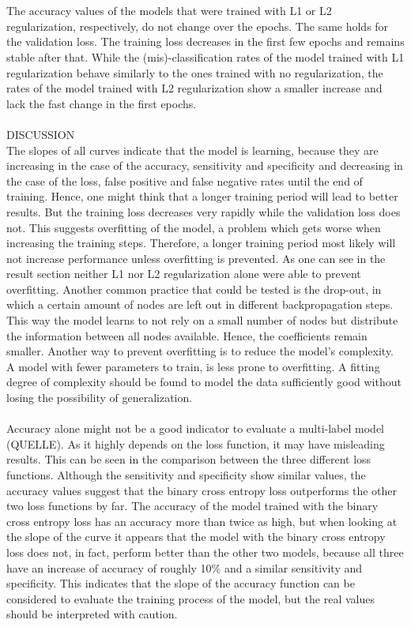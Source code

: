 \\
\\
The accuracy values of the models that were trained with L1 or L2 regularization, respectively, do not change over the epochs. The same holds for the validation loss. The training loss decreases in the first few epochs and remains stable after that.
While the (mis)-classification rates of the model trained with L1 regularization behave similarly to the ones trained with no regularization, the rates of the model trained with L2 regularization show a smaller increase and lack the fast change in the first epochs. \\
\\
DISCUSSION \\
The slopes of all curves indicate that the model is learning, because they are increasing in the case of the accuracy, sensitivity and specificity and decreasing in the case of the loss, false positive and false negative rates until the end of training. Hence, one might think that a longer training period will lead to better results. But the training loss decreases very rapidly while the validation loss does not. This suggests overfitting of the model, a problem which gets worse when increasing the training steps. Therefore, a longer training period most likely will not increase performance unless overfitting is prevented. As one can see in the result section neither L1 nor L2 regularization alone were able to prevent overfitting. Another common practice that could be tested is the drop-out, in which a certain amount of nodes are left out in different backpropagation steps. This way the model learns to not rely on a small number of nodes but distribute the information between all nodes available. Hence, the coefficients remain smaller. Another way to prevent overfitting is to reduce the model's complexity. A model with fewer parameters to train, is less prone to overfitting. A fitting degree of complexity should be found to model the data sufficiently good without losing the possibility of generalization. \\
\\
Accuracy alone might not be a good indicator to evaluate a multi-label model (QUELLE). As it highly depends on the loss function, it may have misleading results. This can be seen in the comparison between the three different loss functions. Although the sensitivity and specificity show similar values, the accuracy values suggest that the binary cross entropy loss outperforms the other two loss functions by far. The accuracy of the model trained with the binary cross entropy loss has an accuracy more than twice as high, but when looking at the slope of the curve it appears that the model with the binary cross entropy loss does not, in fact, perform better than the other two models, because all three have an increase of accuracy of roughly 10\% and a similar sensitivity and specificity. This indicates that the slope of the accuracy function can be considered to evaluate the training process of the model, but the real values should be interpreted with caution. \\
